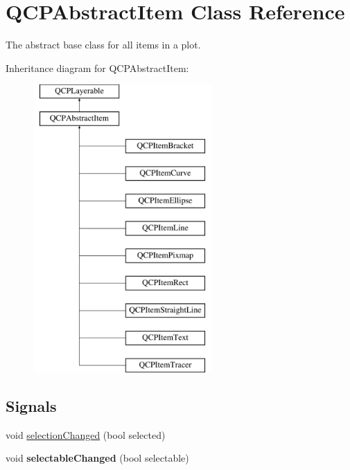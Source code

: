 \hypertarget{classQCPAbstractItem}{\section{\-Q\-C\-P\-Abstract\-Item \-Class \-Reference}
\label{classQCPAbstractItem}
}


\-The abstract base class for all items in a plot.  


\-Inheritance diagram for \-Q\-C\-P\-Abstract\-Item\-:\begin{figure}[H]
\begin{center}
\leavevmode
\includegraphics[height=11.000000cm]{classQCPAbstractItem}
\end{center}
\end{figure}
\subsection*{\-Signals}
\begin{DoxyCompactItemize}
\item 
void \hyperlink{classQCPAbstractItem_aa5cffb034fc65dbb91c77e02c1c14251}{selection\-Changed} (bool selected)
\item 
\hypertarget{classQCPAbstractItem_a5b266c11aac61cb511901f3911dac2a3}{void {\bfseries selectable\-Changed} (bool selectable)}\label{classQCPAbstractItem_a5b266c11aac61cb511901f3911dac2a3}

\end{DoxyCompactItemize}

